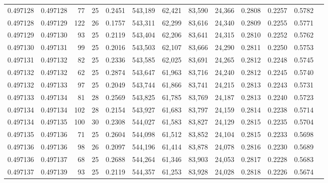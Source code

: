 \begin{tabular}{rrrrrrrrrrrrr}
0.497128 & 0.497128 &  77 &  25 &                                     0.2451 & 543,189 &  62,421 &  83,590 &  24,366 & 0.2808 & 0.2257 & 0.5782 \\
0.497128 & 0.497129 & 122 &  26 &                                     0.1757 & 543,311 &  62,299 &  83,616 &  24,340 & 0.2809 & 0.2255 & 0.5771 \\
0.497129 & 0.497130 &  93 &  25 &                                     0.2119 & 543,404 &  62,206 &  83,641 &  24,315 & 0.2810 & 0.2252 & 0.5762 \\
0.497130 & 0.497131 &  99 &  25 &                                     0.2016 & 543,503 &  62,107 &  83,666 &  24,290 & 0.2811 & 0.2250 & 0.5753 \\
0.497131 & 0.497132 &  82 &  25 &                                     0.2336 & 543,585 &  62,025 &  83,691 &  24,265 & 0.2812 & 0.2248 & 0.5745 \\
0.497132 & 0.497132 &  62 &  25 &                                     0.2874 & 543,647 &  61,963 &  83,716 &  24,240 & 0.2812 & 0.2245 & 0.5740 \\
0.497132 & 0.497133 &  97 &  25 &                                     0.2049 & 543,744 &  61,866 &  83,741 &  24,215 & 0.2813 & 0.2243 & 0.5731 \\
0.497133 & 0.497134 &  81 &  28 &                                     0.2569 & 543,825 &  61,785 &  83,769 &  24,187 & 0.2813 & 0.2240 & 0.5723 \\
0.497134 & 0.497134 & 102 &  28 &                                     0.2154 & 543,927 &  61,683 &  83,797 &  24,159 & 0.2814 & 0.2238 & 0.5714 \\
0.497134 & 0.497135 & 100 &  30 &                                     0.2308 & 544,027 &  61,583 &  83,827 &  24,129 & 0.2815 & 0.2235 & 0.5704 \\
0.497135 & 0.497136 &  71 &  25 &                                     0.2604 & 544,098 &  61,512 &  83,852 &  24,104 & 0.2815 & 0.2233 & 0.5698 \\
0.497136 & 0.497136 &  98 &  26 &                                     0.2097 & 544,196 &  61,414 &  83,878 &  24,078 & 0.2816 & 0.2230 & 0.5689 \\
0.497136 & 0.497137 &  68 &  25 &                                     0.2688 & 544,264 &  61,346 &  83,903 &  24,053 & 0.2817 & 0.2228 & 0.5683 \\
0.497137 & 0.497139 &  93 &  25 &                                     0.2119 & 544,357 &  61,253 &  83,928 &  24,028 & 0.2818 & 0.2226 & 0.5674 \\

\end{tabular}
